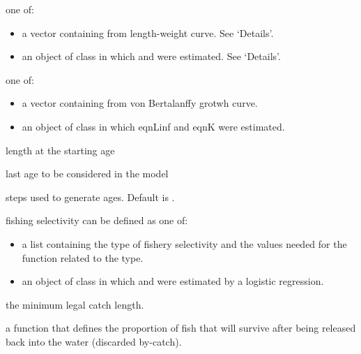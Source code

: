 \documentclass[a4paper]{book}
\begin{document}
\begin{Arguments}
\begin{ldescription}
\item[\code{LW}] one of:
\begin{itemize}

\item a vector containing  from length-weight curve. See `Details'. 
\item an object of class  in which \eqn{\alpha}{} and \eqn{\beta}{} were estimated. See `Details'.        

\end{itemize}


\item[\code{vonB}] one of:
\begin{itemize}

\item a vector containing  from von Bertalanffy grotwh curve.
\item an object of class  in which eqnLinf and eqnK were estimated.      

\end{itemize}


\item[\code{l.start}] length at the starting age

\item[\code{last.age}] last age to be considered in the model

\item[\code{age.step}] steps used to generate ages. Default is .


\item[\code{Fsel.type}] fishing selectivity can be defined as one of:
\begin{itemize}

\item a list containing the type of fishery selectivity and the values needed for the function related to the type.
\item an object of class  in which \eqn{\alpha}{} and \eqn{\beta}{} were estimated by a logistic regression.        

\end{itemize}


\item[\code{fish.lim}] the minimum legal catch length.

\item[\code{prop.surv}] a function that defines the proportion of fish that will survive after being released back into the water (discarded by-catch).


\end{ldescription}
\end{Arguments}
\end{document}
